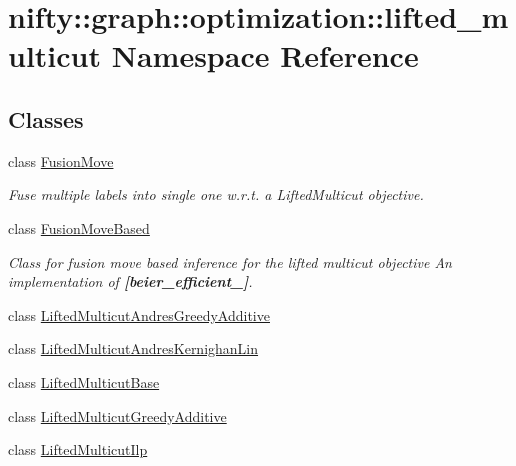 \hypertarget{namespacenifty_1_1graph_1_1optimization_1_1lifted__multicut}{}\section{nifty\+:\+:graph\+:\+:optimization\+:\+:lifted\+\_\+multicut Namespace Reference}
\label{namespacenifty_1_1graph_1_1optimization_1_1lifted__multicut}
\subsection*{Classes}
\begin{DoxyCompactItemize}
\item 
class \hyperlink{classnifty_1_1graph_1_1optimization_1_1lifted__multicut_1_1FusionMove}{Fusion\+Move}
\begin{DoxyCompactList}\small\item\em Fuse multiple labels into single one w.\+r.\+t. a Lifted\+Multicut objective. \end{DoxyCompactList}\item 
class \hyperlink{classnifty_1_1graph_1_1optimization_1_1lifted__multicut_1_1FusionMoveBased}{Fusion\+Move\+Based}
\begin{DoxyCompactList}\small\item\em Class for fusion move based inference for the lifted multicut objective An implementation of {\bfseries [beier\+\_\+efficient\+\_]}. \end{DoxyCompactList}\item 
class \hyperlink{classnifty_1_1graph_1_1optimization_1_1lifted__multicut_1_1LiftedMulticutAndresGreedyAdditive}{Lifted\+Multicut\+Andres\+Greedy\+Additive}
\item 
class \hyperlink{classnifty_1_1graph_1_1optimization_1_1lifted__multicut_1_1LiftedMulticutAndresKernighanLin}{Lifted\+Multicut\+Andres\+Kernighan\+Lin}
\item 
class \hyperlink{classnifty_1_1graph_1_1optimization_1_1lifted__multicut_1_1LiftedMulticutBase}{Lifted\+Multicut\+Base}
\item 
class \hyperlink{classnifty_1_1graph_1_1optimization_1_1lifted__multicut_1_1LiftedMulticutGreedyAdditive}{Lifted\+Multicut\+Greedy\+Additive}
\item 
class \hyperlink{classnifty_1_1graph_1_1optimization_1_1lifted__multicut_1_1LiftedMulticutIlp}{Lifted\+Multicut\+Ilp}
\item 

\end{DoxyCompactItemize}

